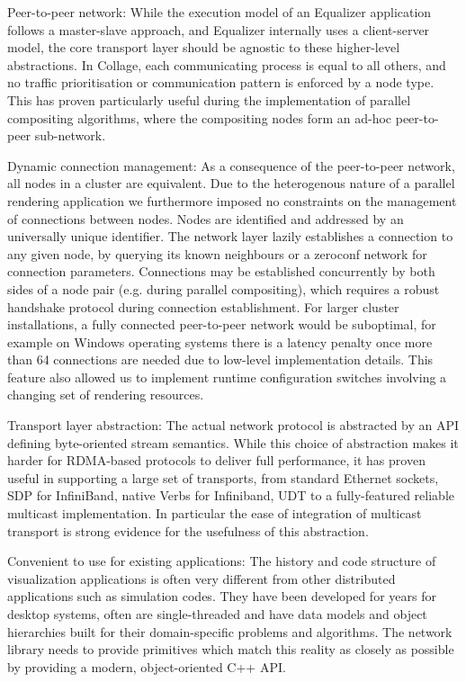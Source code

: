 \begin{compactdesc}

\item[Peer-to-peer network:] While the execution model of an Equalizer
application follows a master-slave approach, and Equalizer internally uses a
client-server model, the core transport layer should be agnostic to these
higher-level abstractions. In Collage, each communicating process is equal to
all others, and no traffic prioritisation or communication pattern is enforced
by a node type. This has proven particularly useful during the implementation of
parallel compositing algorithms, where the compositing nodes form an ad-hoc
peer-to-peer sub-network.

\item[Dynamic connection management:] As a consequence of the peer-to-peer
network, all nodes in a cluster are equivalent. Due to the heterogenous nature
of a parallel rendering application we furthermore imposed no constraints on
the management of connections between nodes. Nodes are identified and addressed
by an universally unique identifier. The network layer lazily establishes a
connection to any given node, by querying its known neighbours or a zeroconf
network for connection parameters. Connections may be established concurrently
by both sides of a node pair (e.g. during parallel compositing), which requires
a robust handshake protocol during connection establishment. For larger cluster
installations, a fully connected peer-to-peer network would be suboptimal, for
example on Windows operating systems there is a latency penalty once more than
64 connections are needed due to low-level implementation details. This feature
also allowed us to implement runtime configuration switches involving a
changing set of rendering resources.

\item[Transport layer abstraction:] The actual network protocol is abstracted
by an API defining byte-oriented stream semantics. While this choice of
abstraction makes it harder for RDMA-based protocols to deliver full
performance, it has proven useful in supporting a large set of transports, from
standard Ethernet sockets, SDP for InfiniBand, native Verbs for Infiniband, UDT
to a fully-featured reliable multicast implementation. In particular the ease
of integration of multicast transport is strong evidence for the usefulness of
this abstraction.

\item[Convenient to use for existing applications:] The history and code
structure of visualization applications is often very different from other
distributed applications such as simulation codes. They have been developed for
years for desktop systems, often are single-threaded and have data models and
object hierarchies built for their domain-specific problems and algorithms. The
network library needs to provide primitives which match this reality as closely
as possible by providing a modern, object-oriented C++ API.

\end{compactdesc}


